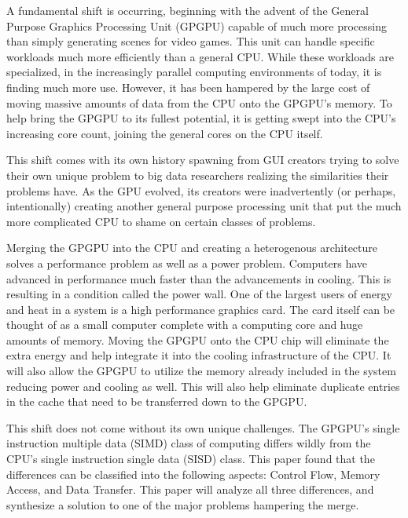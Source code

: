 A fundamental shift is occurring, beginning with the advent of the General Purpose Graphics Processing Unit (GPGPU) capable of much more processing than simply generating scenes for video games. This unit can handle specific workloads much more efficiently than a general CPU. While these workloads are specialized, in the increasingly parallel computing environments of today, it is finding much more use. However, it has been hampered by the large cost of moving massive amounts of data from the CPU onto the GPGPU's memory. To help bring the GPGPU to its fullest potential, it is getting swept into the CPU's increasing core count, joining the general cores on the CPU itself. 

This shift comes with its own history spawning from GUI creators trying to solve their own unique problem to big data researchers realizing the similarities their problems have. As the GPU evolved, its creators were inadvertently (or perhaps, intentionally) creating another general purpose processing unit that put the much more complicated CPU to shame on certain classes of problems. 

Merging the GPGPU into the CPU and creating a heterogenous architecture solves a performance problem as well as a power problem. Computers have advanced in performance much faster than the advancements in cooling. This is resulting in a condition called the power wall. One of the largest users of energy and heat in a system is a high performance graphics card. The card itself can be thought of as a small computer complete with a computing core and huge amounts of memory. Moving the GPGPU onto the CPU chip will eliminate the extra energy and help integrate it into the cooling infrastructure of the CPU. It will also allow the GPGPU to utilize the memory already included in the system reducing power and cooling as well. This will also help eliminate duplicate entries in the cache that need to be transferred down to the GPGPU. \cite{nvidia}

This shift does not come without its own unique challenges. The GPGPU's single instruction multiple data (SIMD) class of computing differs wildly from the CPU's single instruction single data (SISD) class. This paper found that the differences can be classified into the following aspects: Control Flow, Memory Access, and Data Transfer. This paper will analyze all three differences, and synthesize a solution to one of the major problems hampering the merge.


